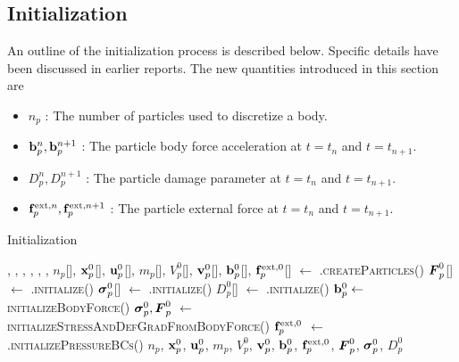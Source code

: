 \subsection{Initialization}
An outline of the initialization process is described below.  Specific details have been 
discussed in earlier reports. The new quantities introduced in this section are
\begin{itemize} 
  \setlength\itemsep{1pt}
  \item $n_p$ : {\Ochre The number of particles used to discretize a body.}
  \item $\mathbf{b}_p^n, \mathbf{b}_p^{n+1}$ : {\Ochre The particle body force acceleration at $t = t_n$ and $t = t_{n+1}$.}
  \item $D_p^n, D_p^{n+1}$ : {\Ochre The particle damage parameter at $t = t_n$ and $t = t_{n+1}$.}
  \item $\mathbf{f}_p^{\text{ext},n}, \mathbf{f}_p^{\text{ext},n+1}$ : {\Ochre The particle external force at $t = t_n$ and $t = t_{n+1}$.}
\end{itemize}
\begin{breakablealgorithm}
  \caption{Initialization}
  \begin{algorithmic}[1]
    \Require {}, , , 
             , ,\WRP 
              , 
        \State $n_p$[\TTmatl], $\mathbf{x}^0_p$[\TTmatl], $\mathbf{u}^0_p$[\TTmatl], $m_p$[\TTmatl], 
             $V^0_p$[\TTmatl], $\mathbf{v}^0_p$[\TTmatl], $\mathbf{b}^0_p$[\TTmatl], \WRP
             $\mathbf{f}^{\text{ext},0}_p$[\TTmatl] $\leftarrow$ \TTmatl.\textsc{createParticles}()
        \State $\boldsymbol{F}^0_p$[\TTmatl] $\leftarrow$ .\textsc{initialize}(\TTmatl)
        \State $\boldsymbol{\sigma}^0_p$[\TTmatl] $\leftarrow$ .\textsc{initialize}(\TTmatl)
        \State $D^0_p$[\TTmatl] $\leftarrow$ .\textsc{initialize}(\TTmatl)
      \EndFor
        \State $\mathbf{b}^0_p \leftarrow$ \textsc{initializeBodyForce}()
        \State $\boldsymbol{\sigma}^0_p, \boldsymbol{F}^0_p$ $\leftarrow$ \textsc{initializeStressAndDefGradFromBodyForce}()
      \EndIf
        \State $\mathbf{f}^{\text{ext},0}_p$ $\leftarrow$ .\textsc{initializePressureBCs}()
      \EndIf
      \State \Return $n_p$, $\mathbf{x}^0_p$, $\mathbf{u}^0_p$, $m_p$, 
             $V^0_p$, $\mathbf{v}^0_p$, $\mathbf{b}^0_p$, $\mathbf{f}^{\text{ext},0}_p$, $\boldsymbol{F}^0_p$, $\boldsymbol{\sigma}^0_p$, $D^0_p$
    \EndProcedure
  \end{algorithmic}
\end{breakablealgorithm}

